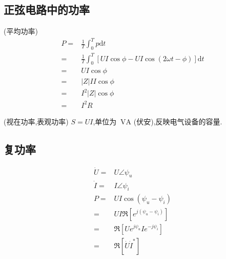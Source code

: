 
\usepackage{../../lectures_preamble}


    \subsection{正弦电路中的功率}
        \begin{definition}
            (平均功率) 
        \begin{align}
            P=&\frac{1}{T}\int_{0}^{T}p\mathrm{d}t\nonumber\\
            =&\frac{1}{T}\int_{0}^{T}[UI\cos \phi -UI\cos{(2\omega t-\phi)}]\mathrm{d}t\nonumber\\
            =&UI\cos \phi\nonumber\\
            =&|Z|I I\cos \phi\nonumber\\
            =&I^2|Z|\cos\phi\nonumber\\
            =&I^2R\nonumber
        \end{align}
        \end{definition}
        \begin{definition}
            (视在功率,表观功率) $S=UI$,单位为 $\ \mathrm{VA}$ (伏安),反映电气设备的容量.
        \end{definition}

    \subsection{复功率}
        \begin{align}
            \dot{U}=&U\angle \psi_{u}\nonumber\\
            \dot{I}=&I\angle\psi_{i}\nonumber\\
            P=&UI\cos{(\psi_{u}-\psi_{i})}\nonumber\\
            =&UI\Re[e^{j(\psi_{u}-\psi_{i})}]\nonumber\\
            =&\Re[Ue^{j\psi_{u}}Ie^{-j\psi_{i}}]\nonumber\\
            =&\Re[\dot{U}\dot{I}^{*}]\nonumber
        \end{align}
        
